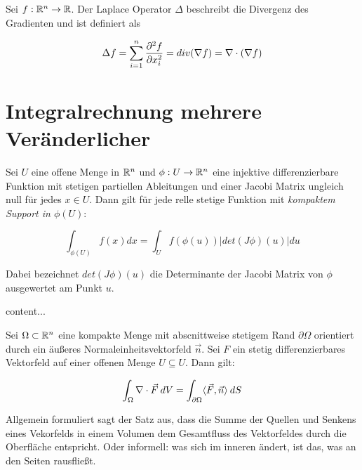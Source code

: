 \begin{definition}
	Sei $f : \mathbb{R}^n \rightarrow \mathbb{R}$. Der Laplace Operator $\Delta$ beschreibt die Divergenz des Gradienten und ist definiert als
	
	\begin{align*}
	\Delta f  = \sum_{i=1}^{n} \frac{\partial ^2f}{\partial x_i^2} = div(\nabla f) = \nabla \cdot (\nabla f)
	\end{align*}
\end{definition}

\pagebreak
	
\section{Integralrechnung mehrere Veränderlicher}

\begin{satz}
	Sei $U$ eine offene Menge in $\mathbb{R}^n$ und $\phi : U \rightarrow \mathbb{R}^n$ eine injektive differenzierbare Funktion mit stetigen partiellen Ableitungen und einer Jacobi Matrix ungleich null für jedes $x \in U$. Dann gilt für jede relle stetige Funktion mit \emph{kompaktem Support in $\phi(U)$}:
	
	\begin{equation}
		\int_{\phi(U)}	 f(x) dx = \int_U f(\phi(u)) |det(J \phi)(u)| du
 	\end{equation}
 	
 	Dabei bezeichnet $det(J \phi)(u)$ die Determinante der Jacobi Matrix von $\phi$ ausgewertet am Punkt $u$.
	
\end{satz}

\begin{satz}
	content...
\end{satz}

\begin{satz}
	Sei $\Omega \subset \mathbb{R}^n$ eine kompakte Menge mit abscnittweise stetigem Rand $\partial \Omega$ orientiert durch ein äußeres Normaleinheitsvektorfeld $\vec{n}$. Sei $F$ ein stetig differenzierbares Vektorfeld auf einer offenen Menge $U \subseteq U$. Dann gilt:
	
	\begin{align*}
		\int_\Omega \nabla \cdot \vec{F} \medspace dV = \int_{\partial \Omega} \langle \vec{F}, \vec{n} \rangle \medspace dS
	\end{align*}
	
	Allgemein formuliert sagt der Satz aus, dass die Summe der Quellen und Senkens eines Vekorfelds in einem Volumen dem Gesamtfluss des Vektorfeldes durch die Oberfläche entspricht.
	Oder informell: was sich im inneren ändert, ist das, was an den Seiten rausfließt.	
	
\end{satz}

